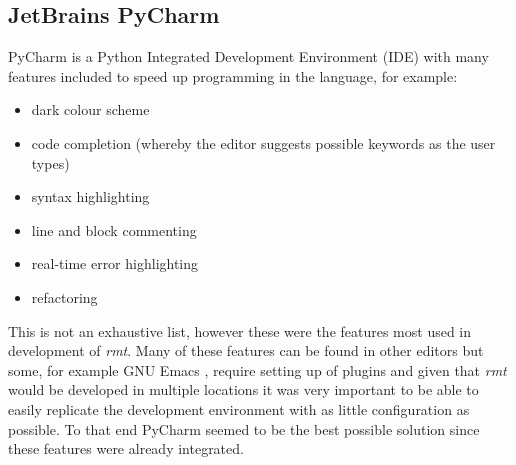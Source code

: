 \subsection{JetBrains PyCharm}
PyCharm \citep{pycharm} is a Python Integrated Development Environment (IDE) with many features included to speed up programming in the language, for example:
\begin{itemize}
	\item dark colour scheme
	\item code completion (whereby the editor suggests possible keywords as the user types)
	\item syntax highlighting
	\item line and block commenting
	\item real-time error highlighting
	\item refactoring
\end{itemize}
This is not an exhaustive list, however these were the features most used in development of \emph{rmt}.
Many of these features can be found in other editors but some, for example GNU Emacs \citeyearpar{emacs}, require setting up of plugins and given that \emph{rmt} would be developed in multiple locations it was very important to be able to easily replicate the development environment with as little configuration as possible.
To that end PyCharm seemed to be the best possible solution since these features were already integrated.
